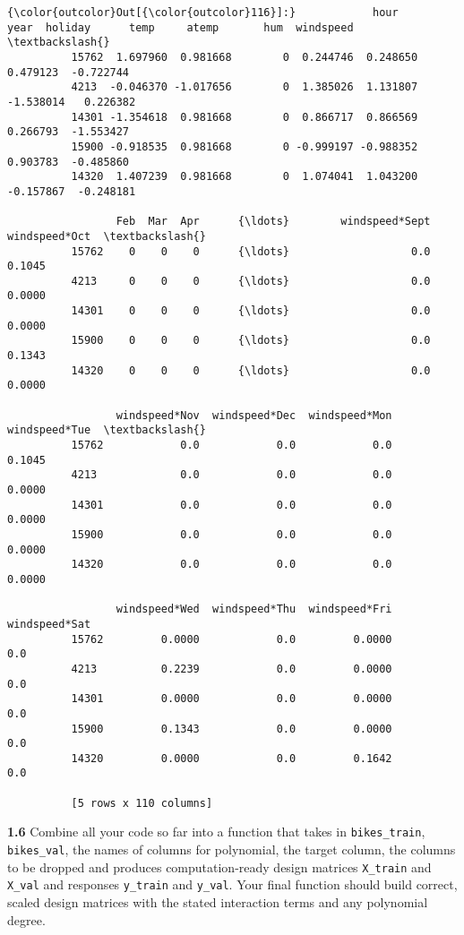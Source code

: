 \documentclass[11pt]{article}
\begin{document}
\begin{Verbatim}[commandchars=\\\{\}]
{\color{outcolor}Out[{\color{outcolor}116}]:}            hour      year  holiday      temp     atemp       hum  windspeed  \textbackslash{}
          15762  1.697960  0.981668        0  0.244746  0.248650  0.479123  -0.722744   
          4213  -0.046370 -1.017656        0  1.385026  1.131807 -1.538014   0.226382   
          14301 -1.354618  0.981668        0  0.866717  0.866569  0.266793  -1.553427   
          15900 -0.918535  0.981668        0 -0.999197 -0.988352  0.903783  -0.485860   
          14320  1.407239  0.981668        0  1.074041  1.043200 -0.157867  -0.248181   
          
                 Feb  Mar  Apr      {\ldots}        windspeed*Sept  windspeed*Oct  \textbackslash{}
          15762    0    0    0      {\ldots}                   0.0         0.1045   
          4213     0    0    0      {\ldots}                   0.0         0.0000   
          14301    0    0    0      {\ldots}                   0.0         0.0000   
          15900    0    0    0      {\ldots}                   0.0         0.1343   
          14320    0    0    0      {\ldots}                   0.0         0.0000   
          
                 windspeed*Nov  windspeed*Dec  windspeed*Mon  windspeed*Tue  \textbackslash{}
          15762            0.0            0.0            0.0         0.1045   
          4213             0.0            0.0            0.0         0.0000   
          14301            0.0            0.0            0.0         0.0000   
          15900            0.0            0.0            0.0         0.0000   
          14320            0.0            0.0            0.0         0.0000   
          
                 windspeed*Wed  windspeed*Thu  windspeed*Fri  windspeed*Sat  
          15762         0.0000            0.0         0.0000            0.0  
          4213          0.2239            0.0         0.0000            0.0  
          14301         0.0000            0.0         0.0000            0.0  
          15900         0.1343            0.0         0.0000            0.0  
          14320         0.0000            0.0         0.1642            0.0  
          
          [5 rows x 110 columns]
\end{Verbatim}
            
    \textbf{1.6} Combine all your code so far into a function that takes in
\texttt{bikes\_train}, \texttt{bikes\_val}, the names of columns for
polynomial, the target column, the columns to be dropped and produces
computation-ready design matrices \texttt{X\_train} and \texttt{X\_val}
and responses \texttt{y\_train} and \texttt{y\_val}. Your final function
should build correct, scaled design matrices with the stated interaction
terms and any polynomial degree.
\end{document}
